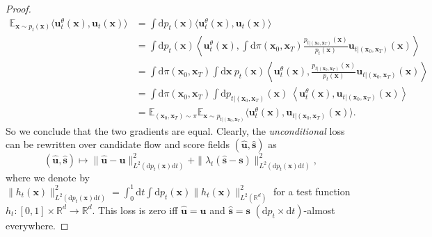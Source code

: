 \documentclass{article}
\newcommand{\diff}{\mathrm{d}}
\newcommand{\E}{\mathbb{E}}
\theoremstyle{newstyle}
\begin{document}
\begin{proof}
  \begin{align}
    \E_{\bm{x} \sim p_t(\bm{x})} \langle \bm{u}_t^\theta(\bm{x}), \bm{u}_t(\bm{x}) \rangle  &= \int \diff p_t(\bm{x}) \langle \bm{u}_t^\theta(\bm{x}), \bm{u}_t(\bm{x}) \rangle  \\
                                                                                            &= \int \diff p_t(\bm{x}) \left\langle \bm{u}_t^\theta(\bm{x}), \int \diff \pi(\bm{x}_0, \bm{x}_T) \frac{p_{t | (\bm{x}_0, \bm{x}_T)}(\bm{x})}{p_t(\bm{x})} \bm{u}_{t | (\bm{x}_0, \bm{x}_T)}(\bm{x}) \right\rangle  \\
                                                                                            &= \int \diff \pi(\bm{x}_0, \bm{x}_T) \int \diff\bm{x} \: p_t(\bm{x}) \left\langle \bm{u}_t^\theta(\bm{x}), \frac{p_{t | (\bm{x}_0, \bm{x}_T)}(\bm{x})}{p_t(\bm{x})} \bm{u}_{t | (\bm{x}_0, \bm{x}_T)}(\bm{x}) \right\rangle  \\
                                                                                            &= \int \diff \pi(\bm{x}_0, \bm{x}_T) \int \diff p_{t | (\bm{x}_0, \bm{x}_T)}(\bm{x}) \: \left\langle \bm{u}_t^\theta(\bm{x}), \bm{u}_{t | (\bm{x}_0, \bm{x}_T)}(\bm{x}) \right\rangle  \\
                                                                                            &= \E_{(\bm{x}_0, \bm{x}_T) \sim \pi} \E_{\bm{x} \sim p_{t | (\bm{x}_0, \bm{x}_T)}} \langle \bm{u}^\theta_t(\bm{x}), \bm{u}_{t | (\bm{x}_0, \bm{x}_T)}(\bm{x}) \rangle . 
  \end{align}
  So we conclude that the two gradients are equal.
  Clearly, the \emph{unconditional} loss can be rewritten over candidate flow and score fields $(\hat{\bm{u}}, \hat{\bm{s}})$ as 
  \[
    (\hat{\bm{u}}, \hat{\bm{s}}) \mapsto \| \hat{\bm{u}} - \bm{u} \|_{L^2(\diff p_t(\bm{x}) \diff t)}^2 + \| \lambda_t (\hat{\bm{s}} - \bm{s}) \|_{L^2(\diff p_t(\bm{x}) \diff t)}^2,
  \]
  where we denote by $\| h_t(\bm{x}) \|_{L^2(\diff p_t(\bm{x}) \diff t)}^2 = \int_0^1 \diff t \int \diff p_t(\bm{x}) \| h_t(\bm{x}) \|^2_{L^2(\mathbb{R}^d)}$ for a test function $h_t : [0, 1] \times \mathbb{R}^d \to \mathbb{R}^d$. This loss is zero iff $\hat{\bm{u}} = \bm{u}$ and $\hat{\bm{s}} = \bm{s}$ $(\diff p_t \times \diff t)$-almost everywhere.


\end{proof}
\end{document}
